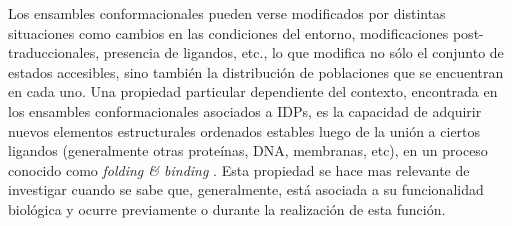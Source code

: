 Los ensambles conformacionales pueden verse modificados por distintas situaciones como cambios en las condiciones del entorno, modificaciones post-traduccionales, presencia de ligandos, etc.,
lo que modifica no sólo el conjunto de estados accesibles, sino también la distribución de poblaciones que se encuentran en cada uno.
Una propiedad particular dependiente del contexto, encontrada en los ensambles conformacionales asociados a IDPs, es la capacidad de adquirir nuevos elementos estructurales ordenados estables luego de la unión a ciertos ligandos 
(generalmente otras proteínas, DNA, membranas, etc), en un proceso conocido como \textit{folding \& binding} \cite{dyson2005intrinsically}. 
Esta propiedad se hace mas relevante de investigar cuando se sabe que, generalmente, está asociada a su funcionalidad biológica y ocurre previamente o durante la realización de esta función.


% 


